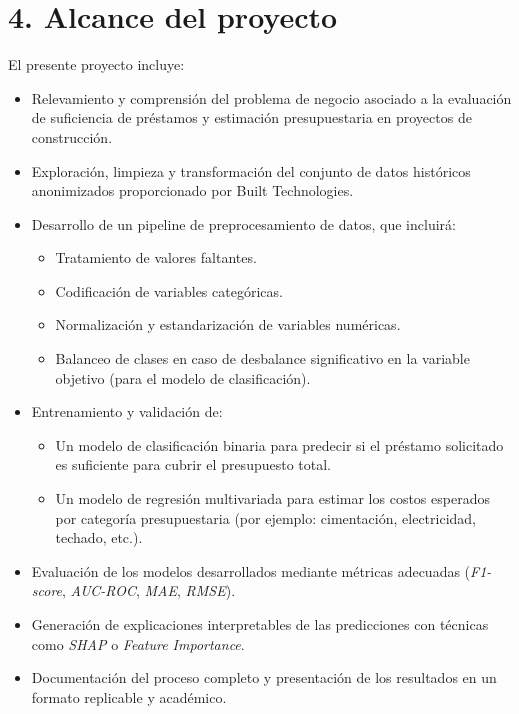 \documentclass[
11pt, %
]{charter}
\begin{document}
\section{4. Alcance del proyecto}
\label{sec:alcance}

El presente proyecto incluye:

\begin{itemize}
    \item Relevamiento y comprensión del problema de negocio asociado a la evaluación de suficiencia de préstamos y estimación presupuestaria en proyectos de construcción.
    \item Exploración, limpieza y transformación del conjunto de datos históricos anonimizados proporcionado por Built Technologies.
    \item Desarrollo de un pipeline de preprocesamiento de datos, que incluirá:
    \begin{itemize}
        \item Tratamiento de valores faltantes.
        \item Codificación de variables categóricas.
        \item Normalización y estandarización de variables numéricas.
        \item Balanceo de clases en caso de desbalance significativo en la variable objetivo (para el modelo de clasificación).
    \end{itemize}
    \item Entrenamiento y validación de:
    \begin{itemize}
        \item Un modelo de clasificación binaria para predecir si el préstamo solicitado es suficiente para cubrir el presupuesto total.
        \item Un modelo de regresión multivariada para estimar los costos esperados por categoría presupuestaria (por ejemplo: cimentación, electricidad, techado, etc.).
    \end{itemize}
    \item Evaluación de los modelos desarrollados mediante métricas adecuadas (\textit{F1-score}, \textit{AUC-ROC}, \textit{MAE}, \textit{RMSE}).
    \item Generación de explicaciones interpretables de las predicciones con técnicas como \textit{SHAP} o \textit{Feature Importance}.
    \item Documentación del proceso completo y presentación de los resultados en un formato replicable y académico.
\end{itemize}
\end{document}
